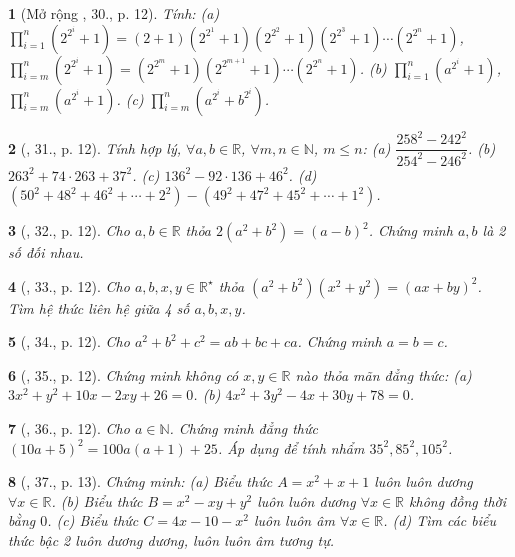 \documentclass{article}
\newtheorem{baitoan}{}
\begin{document}
\begin{baitoan}[Mở rộng \cite{Tuyen_Toan_8}, 30., p. 12]
	Tính: (a) $\prod_{i=1}^n (2^{2^i} + 1) = (2 + 1)(2^{2^1} + 1)(2^{2^2} + 1)(2^{2^3} + 1)\cdots(2^{2^n} + 1)$, $\prod_{i=m}^n (2^{2^i} + 1) = (2^{2^m} + 1)(2^{2^{m+1}} + 1)\cdots(2^{2^n} + 1)$. (b) $\prod_{i=1}^n (a^{2^i} + 1)$, $\prod_{i=m}^n (a^{2^i} + 1)$. (c) $\prod_{i=m}^n (a^{2^i} + b^{2^i})$.
\end{baitoan}

\begin{baitoan}[\cite{Tuyen_Toan_8}, 31., p. 12]
	Tính hợp lý, $\forall a,b\in\mathbb{R}$, $\forall m,n\in\mathbb{N}$, $m\le n$: (a) $\dfrac{258^2 - 242^2}{254^2 - 246^2}$. (b) $263^2 + 74\cdot263 + 37^2$. (c) $136^2 - 92\cdot136 + 46^2$. (d) $(50^2 + 48^2 + 46^2 + \cdots + 2^2) - (49^2 + 47^2 + 45^2 + \cdots + 1^2)$.
\end{baitoan}

\begin{baitoan}[\cite{Tuyen_Toan_8}, 32., p. 12]
	Cho $a,b\in\mathbb{R}$ thỏa $2(a^2 + b^2) = (a - b)^2$. Chứng minh $a,b$ là 2 số đối nhau.
\end{baitoan}

\begin{baitoan}[\cite{Tuyen_Toan_8}, 33., p. 12]
	Cho $a,b,x,y\in\mathbb{R}^\star$ thỏa $(a^2 + b^2)(x^2 + y^2) = (ax + by)^2$. Tìm hệ thức liên hệ giữa 4 số $a,b,x,y$.
\end{baitoan}

\begin{baitoan}[\cite{Tuyen_Toan_8}, 34., p. 12]
	Cho $a^2 + b^2 + c^2 = ab + bc + ca$. Chứng minh $a = b = c$.
\end{baitoan}

\begin{baitoan}[\cite{Tuyen_Toan_8}, 35., p. 12]
	Chứng minh không có $x,y\in\mathbb{R}$ nào thỏa mãn đẳng thức: (a) $3x^2 + y^2 + 10x - 2xy + 26 = 0$. (b) $4x^2 + 3y^2 - 4x + 30y + 78 = 0$.
\end{baitoan}

\begin{baitoan}[\cite{Tuyen_Toan_8}, 36., p. 12]
	Cho $a\in\mathbb{N}$. Chứng minh đẳng thức $(10a + 5)^2 = 100a(a + 1) + 25$. Áp dụng để tính nhẩm $35^2,85^2,105^2$.
\end{baitoan}

\begin{baitoan}[\cite{Tuyen_Toan_8}, 37., p. 13]
	Chứng minh: (a) Biểu thức $A = x^2 + x + 1$ luôn luôn dương $\forall x\in\mathbb{R}$. (b) Biểu thức $B = x^2 - xy + y^2$ luôn luôn dương $\forall x\in\mathbb{R}$ không đồng thời bằng $0$. (c) Biểu thức $C = 4x - 10 - x^2$ luôn luôn âm $\forall x\in\mathbb{R}$. (d) Tìm các biểu thức bậc 2 luôn dương dương, luôn luôn âm tương tự.
\end{baitoan}
\end{document}
